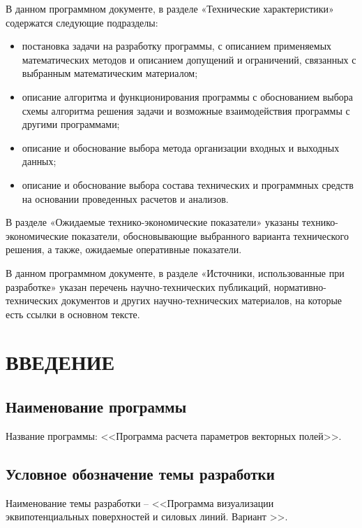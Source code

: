 \documentclass[14pt,a4paper,final]{extreport}
\begin{document}
В данном программном документе, в разделе «Технические характеристики» содержатся следующие подразделы:
\begin{itemize}
	\item	постановка задачи на разработку программы, с описанием применяемых математических методов и описанием допущений и ограничений, связанных с выбранным математическим материалом; 
	\item	описание алгоритма и функционирования программы с обоснованием выбора схемы алгоритма решения задачи и возможные взаимодействия программы с другими программами; 
	\item	описание и обоснование выбора метода организации входных и выходных данных; 
	\item	описание и обоснование выбора состава технических и программных средств на основании проведенных расчетов и анализов.
\end{itemize}

В разделе «Ожидаемые технико-экономические показатели» указаны технико-экономические показатели, обосновывающие выбранного варианта технического решения, а также, ожидаемые оперативные показатели. 

В данном программном документе, в разделе «Источники, использованные при разработке» указан перечень научно-технических публикаций, нормативно-технических документов и других научно-технических материалов, на которые есть ссылки в основном тексте.

\pagebreak


\tableofcontents

\pagebreak

\chapter{ВВЕДЕНИЕ}
\section{Наименование программы}
Название программы: <<Программа расчета параметров векторных полей>>.

\section{Условное обозначение темы разработки}
Наименование темы разработки -- <<Программа визуализации эквипотенциальных поверхностей и силовых линий. Вариант \variant>>.
\end{document}
